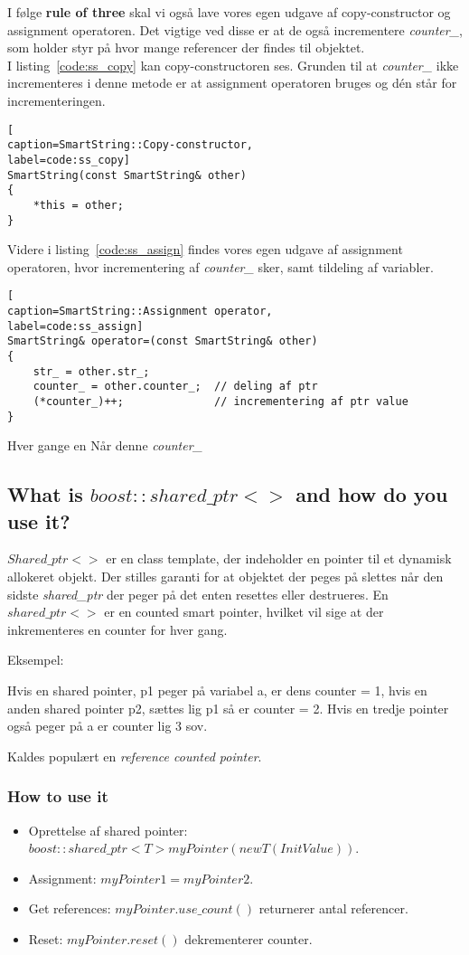 I følge \textbf{rule of three} skal vi også lave vores egen udgave af copy-constructor og assignment operatoren.
Det vigtige ved disse er at de også incrementere \textit{counter\_}, som holder styr på hvor mange referencer der findes til objektet.\\

I listing~\ref{code:ss_copy} kan copy-constructoren ses. Grunden til at \textit{counter\_} ikke incrementeres i denne metode er at assignment operatoren bruges og dén står for incrementeringen. 

\begin{lstlisting}[
caption=SmartString::Copy-constructor, 
label=code:ss_copy]
SmartString(const SmartString& other)
{
	*this = other;
}
\end{lstlisting}

Videre i listing~\ref{code:ss_assign} findes vores egen udgave af assignment operatoren, hvor incrementering af \textit{counter\_} sker, samt tildeling af variabler.

\begin{lstlisting}[
caption=SmartString::Assignment operator,
label=code:ss_assign]
SmartString& operator=(const SmartString& other)
{
	str_ = other.str_;
	counter_ = other.counter_;	// deling af ptr
	(*counter_)++;				// incrementering af ptr value
}
\end{lstlisting}

Hver gange en 
Når denne \textit{counter\_} 

\subsection{What is $boost::shared\_ptr<>$ and how do you use it?}

$Shared\_ptr<>$ er en class template, der indeholder en pointer til et dynamisk allokeret objekt. Der stilles garanti for at objektet der peges på slettes når den sidste \textit{shared\_ptr} der peger på det enten resettes eller destrueres. En $shared\_ptr<>$ er en counted smart pointer, hvilket vil sige at der inkrementeres en counter for hver gang.

Eksempel:

Hvis en shared pointer, p1 peger på variabel a, er dens counter = 1, hvis en anden shared pointer p2, sættes lig p1 så er counter = 2. Hvis en tredje pointer også peger på a er counter lig 3 sov.

Kaldes populært en \textit{reference counted pointer}.

\subsubsection{How to use it}
\begin{itemize}
	\item Oprettelse af shared pointer: $boost::shared\_ptr<T> myPointer(new T(InitValue))$.
	\item Assignment: $myPointer1 = myPointer2$.
	\item Get references: $myPointer.use\_count()$ returnerer antal referencer.
	\item Reset: $myPointer.reset()$ dekrementerer counter.
\end{itemize}

